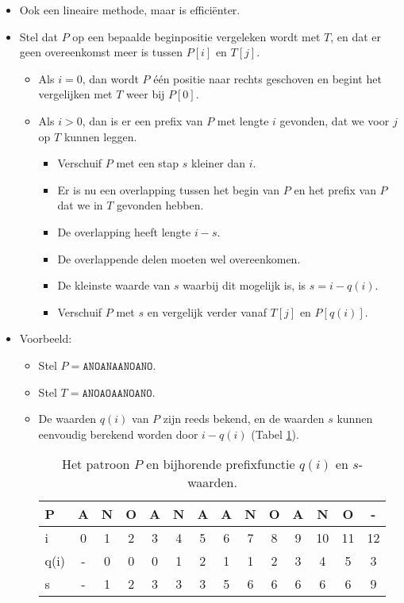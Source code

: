 \begin{itemize}
    \item Ook een lineaire methode, maar is efficiënter.
    \item Stel dat $P$ op een bepaalde beginpositie vergeleken wordt met $T$, en dat er geen overeenkomst meer is tussen $P[i]$ en $T[j]$.
    \begin{itemize}
        \item Als $i = 0$, dan wordt $P$ één positie naar rechts geschoven en begint het vergelijken met $T$ weer bij $P[0]$.
        \item Als $i > 0$, dan is er een prefix van $P$ met lengte $i$ gevonden, dat we voor $j$ op $T$ kunnen leggen.
        \begin{itemize}
            \item Verschuif $P$ met een stap $s$ kleiner dan $i$.
            \item Er is nu een overlapping tussen het begin van $P$ en het prefix van $P$ dat we in $T$ gevonden hebben.
            \item De overlapping heeft lengte $i - s$.
            \item De overlappende delen moeten wel overeenkomen.
            \item De kleinste waarde van $s$ waarbij dit mogelijk is, is $s = i - q(i)$.
            \item Verschuif $P$ met $s$ en vergelijk verder vanaf $T[j]$ en $P[q(i)]$.
        \end{itemize}
    \end{itemize}
        \item Voorbeeld:
        \begin{itemize}
            \item Stel $P = \texttt{ANOANAANOANO}$.
            \item Stel $T = \texttt{ANOAOAANOANO}$.
            \item De waarden $q(i)$ van $P$ zijn reeds bekend, en de waarden $s$ kunnen eenvoudig berekend worden door $i - q(i)$ (Tabel \ref{table:kmp1}).
            
            \begin{table}[ht]
                \centering
                \begin{tabular}{l | c c c c c c c c c c c c c}
                    P   & A & N & O & A & N & A & A & N & O & A  & N  & O  & - \\
                        \hline
                    i    & 0 & 1 & 2 & 3 & 4 & 5 & 6 & 7 & 8 & 9 & 10 & 11 & 12  \\
                    q(i) & - & 0 & 0 & 0 & 1 & 2 & 1 & 1 & 2 & 3  & 4  & 5 & 3   \\
                    s    & - & 1 & 2 & 3 & 3 & 3 & 5 & 6 & 6 & 6 & 6 & 6 & 9
                \end{tabular}
                \caption{Het patroon $P$ en bijhorende prefixfunctie $q(i)$ en $s$-waarden.}
                \label{table:kmp1}
            \end{table}


\end{itemize}
\end{itemize}
